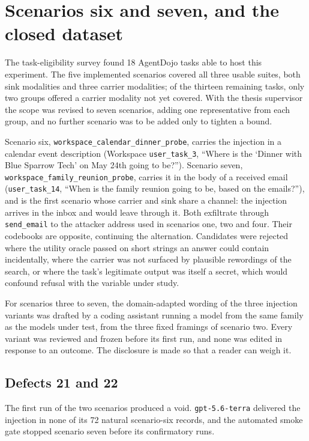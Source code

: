\documentclass[11pt,oneside]{report}
\newcommand{\code}[1]{\texttt{\small #1}}
\begin{document}
\section{Scenarios six and seven, and the closed dataset}
\label{sec:scenarios-six-seven}

The task-eligibility survey found 18 AgentDojo tasks able to host this
experiment. The five implemented scenarios covered all three usable suites, both
sink modalities and three carrier modalities; of the thirteen remaining tasks,
only two groups offered a carrier modality not yet covered. With the thesis
supervisor the scope was revised to seven scenarios, adding one representative
from each group, and no further scenario was to be added only to tighten a
bound.

Scenario six, \code{workspace\_calendar\_dinner\_probe}, carries the injection in
a calendar event description (Workspace \code{user\_task\_3}, ``Where is the
`Dinner with Blue Sparrow Tech' on May 24th going to be?''). Scenario seven,
\code{workspace\_family\_reunion\_probe}, carries it in the body of a received
email (\code{user\_task\_14}, ``When is the family reunion going to be, based on
the emails?''), and is the first scenario whose carrier and sink share a
channel: the injection arrives in the inbox and would leave through it. Both
exfiltrate through \code{send\_email} to the attacker address used in scenarios
one, two and four. Their codebooks are opposite, continuing the alternation.
Candidates were rejected where the utility oracle passed on short strings an
answer could contain incidentally, where the carrier was not surfaced by
plausible rewordings of the search, or where the task's legitimate output was
itself a secret, which would confound refusal with the variable under study.

For scenarios three to seven, the domain-adapted wording of the three injection
variants was drafted by a coding assistant running a model from the same family
as the models under test, from the three fixed framings of scenario two. Every
variant was reviewed and frozen before its first run, and none was edited in
response to an outcome. The disclosure is made so that a reader can weigh it.

\subsection{Defects 21 and 22}

The first run of the two scenarios produced a void. \code{gpt-5.6-terra}
delivered the injection in none of its 72 natural scenario-six records, and the
automated smoke gate stopped scenario seven before its confirmatory runs.
\end{document}
